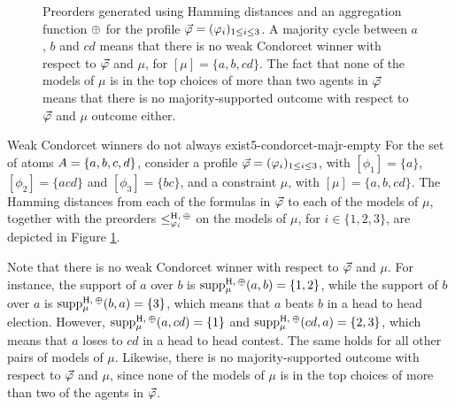 \begin{figure}
\begin{minipage}{0.45\textwidth}
	\end{minipage}
	\caption{
		Preorders generated using Hamming distances
		and an aggregation function $\agg$
		for the profile $\P=(\phi_i)_{1\le i \le 3}$.
		A majority cycle between $a$, $b$ and $cd$
		means that there is no weak Condorcet winner 
		with respect to $\P$ and $\mu$,
		for $[\mu]=\{a,b,cd\}$.
		The fact that none of the models of $\mu$ is 
		in the top choices of more than two agents in 
		$\P$ means that there is no majority-supported 
		outcome	with respect to $\P$ and $\mu$ outcome either.
	}
	\label{fig:5-condorcet-majr-empty}
\end{figure}

\begin{xmpl}{Weak Condorcet winners do not always exist}{5-condorcet-majr-empty}
	For the set of atoms $\Atoms=\{a,b,c,d\}$,
	consider a profile $\P=(\phi_i)_{1\le i \le 3}$,
	with $[\phi_{1}]=\{a\}$, $[\phi_{2}]=\{acd\}$ and $[\phi_{3}]=\{bc\}$,
	and a constraint $\mu$,
	with $[\mu]=\{a,b,cd\}$.
	The Hamming distances from each of the formulas in $\P$ to 
	each of the models of $\mu$, 
	together with the preorders $\le^{\hamming,\:\agg}_{\phi_{i}}$
	on the models of $\mu$,	for $i\in\{1,2,3\}$,
	are depicted in Figure \ref{fig:5-condorcet-majr-empty}.

	Note that there is no weak Condorcet winner with respect to $\P$ and $\mu$. 
	For instance, the support of $a$ over $b$ is $\supp^{\hamming,\:\agg}_{\mu}(a,b)=\{1,2\}$,
	while the support of $b$ over $a$ is $\supp^{\hamming,\:\agg}_{\mu}(b,a)=\{3\}$,
	which means that $a$ beats $b$ in a head to head election.
	However, $\supp^{\hamming,\:\agg}_{\mu}(a,cd)=\{1\}$ and $\supp^{\hamming,\:\agg}_{\mu}(cd,a)=\{2,3\}$,
	which means that $a$ loses to $cd$ in a head to head contest.
	The same holds for all other pairs of models of $\mu$.
	Likewise, there is no majority-supported outcome
	with respect to $\P$ and $\mu$,
	since none of the models of $\mu$ is in the top choices of more 
	than two of the agents in $\P$.
\end{xmpl}

